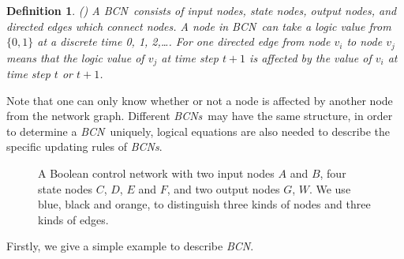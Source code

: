 \documentclass[conference]{IEEEtran} %
\newtheorem{definition}{Definition}
\def \BCN {{\em BCN}}
\def \BCNs {{\em BCNs}}
\begin{document}
\begin{definition}
(\cite{Ideker2001A}) A \BCN\ consists of input nodes, state nodes, output nodes, and directed edges which connect nodes. A node in \BCN\ can take a logic value from $\{0,1\}$ at a discrete time 0, 1, 2,\ldots. For one directed edge from node $v_i$ to node $v_j$ means that the logic value of $v_j$ at time step $t+1$ is affected by the value of $v_i$ at time step $t$ or $t+1$. 
\end{definition}


Note that one can only know whether or not a node is affected by another node from the network graph. Different \BCNs\ may have the same structure, in order to determine a \BCN\ uniquely, logical equations are also needed to describe the specific updating rules of {\em BCNs}.

 
 \begin{figure}[thpb]
      \centering
      
      \caption{A Boolean control network with two input nodes $A$ and $B$, four state nodes $C$, $D$, $E$ and $F$, and two output nodes $G$, $W$. We use blue, black and orange, to distinguish three kinds of nodes and three kinds of edges.}
      \label{fig:1}
  \end{figure}

Firstly, we give a simple example to describe {\em BCN}.
\end{document}
